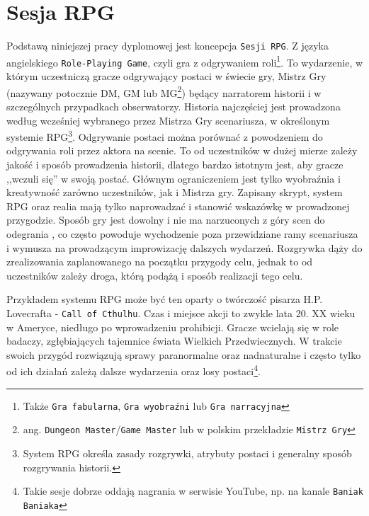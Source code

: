 \documentclass[shortabstract,inz]{iithesis}
\begin{document}
		\section{Sesja RPG}
			Podstawą niniejszej pracy dyplomowej jest koncepcja \texttt{Sesji RPG}. Z języka angielskiego \texttt{Role-Playing Game}, czyli gra z odgrywaniem roli\footnote{Także \texttt{Gra fabularna}, \texttt{Gra wyobraźni} lub \texttt{Gra narracyjna}}. To wydarzenie, w którym uczestniczą gracze odgrywający postaci w świecie gry, Mistrz Gry (nazywany potocznie DM, GM lub MG\footnote{ang. \texttt{Dungeon Master}/\texttt{Game Master} lub w polskim przekładzie \texttt{Mistrz Gry}}) będący narratorem historii i w szczególnych przypadkach obserwatorzy. Historia najczęściej jest prowadzona według wcześniej wybranego przez Mistrza Gry scenariusza, w określonym systemie RPG\footnote{System RPG określa zasady rozgrywki, atrybuty postaci i generalny sposób rozgrywania historii.}. Odgrywanie postaci można porównać z powodzeniem do odgrywania roli przez aktora na scenie. To od uczestników w dużej mierze zależy jakość i sposób prowadzenia historii, dlatego bardzo istotnym jest, aby gracze ,,wczuli się'' w swoją postać. Głównym ograniczeniem jest tylko wyobraźnia i kreatywność zarówno uczestników, jak i Mistrza gry. Zapisany skrypt, system RPG oraz realia mają tylko naprowadzać i stanowić wskazówkę w prowadzonej przygodzie. Sposób gry jest dowolny i nie ma narzuconych z góry scen do odegrania , co często powoduje wychodzenie poza przewidziane ramy scenariusza i wymusza na prowadzącym improwizację dalszych wydarzeń. Rozgrywka dąży do zrealizowania zaplanowanego na początku przygody celu, jednak to od uczestników zależy droga, którą podążą i sposób realizacji tego celu. 
			
			Przykładem systemu RPG może być ten oparty o twórczość pisarza H.P. Lovecrafta - \texttt{Call of Cthulhu}. Czas i miejsce akcji to zwykle lata 20. XX wieku w Ameryce, niedługo po wprowadzeniu prohibicji. Gracze wcielają się w role badaczy, zgłębiających tajemnice świata Wielkich Przedwiecznych. W trakcie swoich przygód rozwiązują sprawy paranormalne oraz nadnaturalne i często tylko od ich działań zależą dalsze wydarzenia oraz losy postaci\footnote{Takie sesje dobrze oddają nagrania w serwisie YouTube, np. na kanale \texttt{Baniak Baniaka}\cite{baniakbaniaka}}.
			
\end{document}
